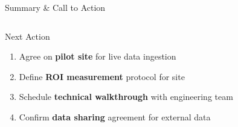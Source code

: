\documentclass[aspectratio=169,12pt]{beamer}
\begin{document}
\begin{frame}[shrink=8]{Summary \& Call to Action}
\begin{columns}[T]
\begin{alertblock}{Next Action}
  \vspace{6pt}
  \begin{enumerate}\setlength\itemsep{6pt}
    \item[\textcolor{white}{\textbf{$\to$}}] Agree on \textbf{pilot site} for live data ingestion
    \item[\textcolor{white}{\textbf{$\to$}}] Define \textbf{ROI measurement} protocol for site
    \item[\textcolor{white}{\textbf{$\to$}}] Schedule \textbf{technical walkthrough} with engineering team
    \item[\textcolor{white}{\textbf{$\to$}}] Confirm \textbf{data sharing} agreement for external data
  \end{enumerate}
  \vspace{6pt}
\end{alertblock}
\vspace{8pt}
\end{columns}
\end{frame}
\end{document}
